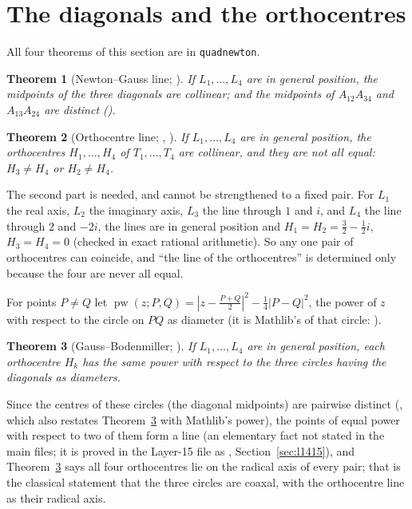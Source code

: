 \documentclass[11pt]{article}
\newtheorem{theorem}{Theorem}
\theoremstyle{definition}
\theoremstyle{remark}
\newcommand{\lean}[1]{\texttt{#1}}
\begin{document}
\section{The diagonals and the orthocentres}\label{sec:diag}

All four theorems of this section are in \lean{quadnewton}.

\begin{theorem}[Newton--Gauss line; ]\label{thm:newton}
If $L_1,\dots,L_4$ are in general position, the midpoints of the three diagonals are collinear; and
the midpoints of $A_{12}A_{34}$ and $A_{13}A_{24}$ are distinct ().
\end{theorem}

\begin{theorem}[Orthocentre line; , ]\label{thm:ortho}
If $L_1,\dots,L_4$ are in general position, the orthocentres $H_1,\dots,H_4$ of $T_1,\dots,T_4$ are
collinear, and they are not all equal: $H_3\neq H_4$ or $H_2\neq H_4$.
\end{theorem}

The second part is needed, and cannot be strengthened to a fixed pair. For $L_1$ the real axis, $L_2$
the imaginary axis, $L_3$ the line through $1$ and $i$, and $L_4$ the line through $2$ and $-2i$, the
lines are in general position and $H_1=H_2=\tfrac32-\tfrac12i$, $H_3=H_4=0$ (checked in exact rational
arithmetic). So any one pair of orthocentres can coincide, and ``the line of the orthocentres'' is
determined only because the four are never all equal.

For points $P\neq Q$ let $\operatorname{pw}(z;P,Q)=|z-\tfrac{P+Q}2|^2-\tfrac14|P-Q|^2$, the power of $z$
with respect to the circle on $PQ$ as diameter (it is Mathlib's 
of that circle: ).

\begin{theorem}[Gauss--Bodenmiller; ]\label{thm:boden}
If $L_1,\dots,L_4$ are in general position, each orthocentre $H_k$ has the same power with respect to
the three circles having the diagonals as diameters.
\end{theorem}

Since the centres of these circles (the diagonal midpoints) are pairwise distinct
(, which also restates Theorem~\ref{thm:boden} with Mathlib's
power), the points of equal power with respect to two of them form a line (an elementary fact not
stated in the main files; it is proved in the Layer-15 file as ,
Section~\ref{sec:l1415}), and Theorem~\ref{thm:boden} says all four orthocentres
lie on the radical axis of every pair; that is the classical statement that the three circles are
coaxal, with the orthocentre line as their radical axis.
\end{document}
